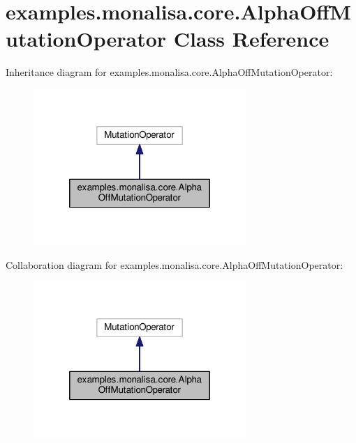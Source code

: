 \hypertarget{classexamples_1_1monalisa_1_1core_1_1_alpha_off_mutation_operator}{\section{examples.\-monalisa.\-core.\-Alpha\-Off\-Mutation\-Operator Class Reference}
\label{classexamples_1_1monalisa_1_1core_1_1_alpha_off_mutation_operator}
}


Inheritance diagram for examples.\-monalisa.\-core.\-Alpha\-Off\-Mutation\-Operator\-:
\nopagebreak
\begin{figure}[H]
\begin{center}
\leavevmode
\includegraphics[width=228pt]{classexamples_1_1monalisa_1_1core_1_1_alpha_off_mutation_operator__inherit__graph}
\end{center}
\end{figure}


Collaboration diagram for examples.\-monalisa.\-core.\-Alpha\-Off\-Mutation\-Operator\-:
\nopagebreak
\begin{figure}[H]
\begin{center}
\leavevmode
\includegraphics[width=228pt]{classexamples_1_1monalisa_1_1core_1_1_alpha_off_mutation_operator__coll__graph}
\end{center}
\end{figure}
